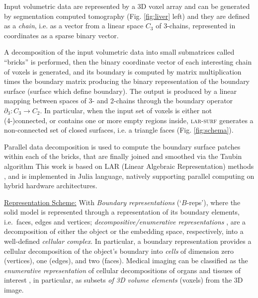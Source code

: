 \documentclass{article}
\begin{document}
Input volumetric data are represented by a 3D voxel array and can be generated by segmentation computed tomography (Fig. \ref{fig:liver} left) and they are defined as a \emph{chain}, i.e. as a vector from a linear space $C_3$ of 3-chains, represented in coordinates as a sparse binary vector.

A decomposition of the input volumetric data into small submatrices called ``bricks'' is performed, then the binary coordinate vector of each interesting chain of voxels is generated, and its boundary is computed by matrix multiplication times the boundary matrix producing the binary representation of the boundary surface (surface which define boundary). %
The output is produced by a linear mapping between spaces of 3- and 2-chains through the boundary operator $\partial_3:C_3 \to C_2$.  In particular, when the input set of voxels is either not (4-)connected, or contains one or more empty regions inside, \textsc{lar-surf} generates a non-connected set of closed surfaces, i.e. a triangle faces (Fig. \ref{fig:schema}). %


Parallel data decomposition is used to compute the boundary surface patches within each of the bricks, that are finally joined and smoothed via the Taubin algorithm 
\cite{Taubin:1995:SPA:218380.218473}
This work is based on LAR (Linear Algebraic Representation) methods 
\cite{DiCarlo2009,DiCarlo2014}
, and is implemented in Julia language, natively supporting parallel computing on hybrid hardware architectures.

\vspace{10pt}
\noindent\underline{
Representation Scheme:}\vspace{0.2em}\newline
With \emph{Boundary representations} (`$B$-reps'), where the solid model is represented through a representation of its boundary elements, i.e.~faces, edges and vertices;
\emph{decompositive/enumerative representations} \cite{Requicha:1980:RRS:356827.356833}, are a decomposition of either the object or the embedding space, respectively, into a well-defined \emph{cellular complex}. In particular, a boundary representation provides a cellular decomposition of the object's boundary into \emph{cells} of dimension zero (vertices), one (edges), and two (faces). Medical imaging can be classified as the \emph{enumerative representation} of cellular decompositions of organs and tissues of interest \cite{Paoluzzi2016}, in particular, as subsets \emph{of 3D volume elements} (voxels) from the 3D image. 
\end{document}
